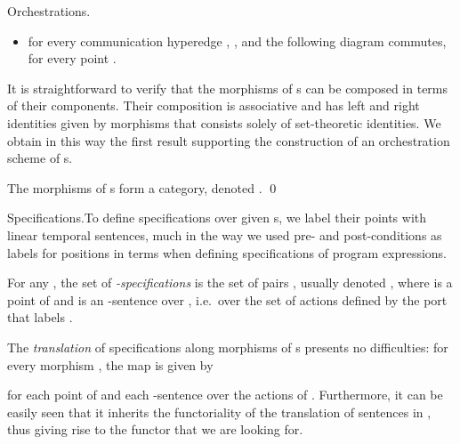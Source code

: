 \documentclass{LMCS}
\begin{document}
\begin{minisection}{Orchestrations.}
\begin{defi}
\begin{itemize}
      \item for every communication hyperedge , ,  and the following diagram commutes, for every point .
        

      \end{itemize}
    \end{defi}

\noindent    It is straightforward to verify that the morphisms of s can be composed in terms of their components.
    Their composition is associative and has left and right identities given by morphisms that consists solely of set-theoretic identities.
    We obtain in this way the first result supporting the construction of an orchestration scheme of s.

    \begin{prop}
      The morphisms of s form a category, denoted .
      \qed
    \end{prop}
    \vspace{-\topsep}
\end{minisection}

  \begin{minisection}{Specifications.}To define specifications over given s, we label their points with linear temporal sentences, much in the way we used pre- and post-conditions as labels for positions in terms when defining specifications of program expressions.

    \begin{defi}
      For any  , the set  of \emph{\nb-specifications} is the set of pairs , usually denoted , where  is a point of  and  is an \nb-sentence over , i.e.\ over the set of actions defined by the port that labels .
    \end{defi}
    
    The \emph{translation} of specifications along morphisms of s presents no difficulties: for every morphism  , the map  is given by
    
    for each point  of  and each \nb-sentence  over the actions of .
    Furthermore, it can be easily seen that it inherits the functoriality of the translation of sentences in , thus giving rise to the functor  that we are looking for.
\end{minisection}
\end{document}

